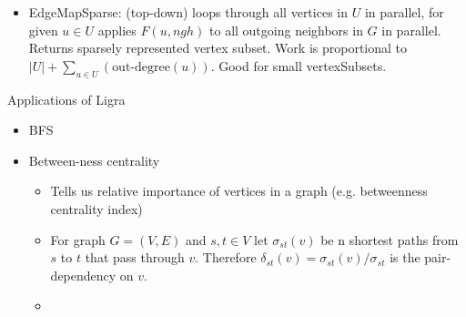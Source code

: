 \begin{itemize}
\begin{itemize}
        \item EdgeMapSparse: (top-down) loops through all vertices in $U$ in parallel, for given $u \in U$ applies $F(u, ngh)$ to all outgoing neighbors in $G$ in parallel. Returns sparsely represented vertex subset. Work is proportional to $|U| + \sum_{u \in U}(\text{out-degree}(u))$. Good for small vertexSubsets.
    \end{itemize}
\end{itemize}

Applications of Ligra
\begin{itemize}
    \item BFS
    \item Between-ness centrality
    \begin{itemize}
        \item Tells us relative importance of vertices in a graph (e.g. betweenness centrality index)
        \item For graph $G = (V, E)$ and $s, t \in V$ let $\sigma_{st}(v)$ be n shortest paths from $s$ to $t$ that pass through $v$. Therefore $\delta_{st}(v) = \sigma_{st}(v)/\sigma_{st}$ is the pair-dependency on $v$.
        \item 
    \end{itemize}
\end{itemize}